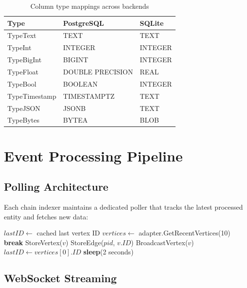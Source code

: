 \documentclass[11pt,twocolumn]{article}
\begin{document}
\begin{table}[h]
\centering
\caption{Column type mappings across backends}
\begin{tabular}{@{}lll@{}}
\toprule
Type & PostgreSQL & SQLite \\
\midrule
TypeText & TEXT & TEXT \\
TypeInt & INTEGER & INTEGER \\
TypeBigInt & BIGINT & INTEGER \\
TypeFloat & DOUBLE PRECISION & REAL \\
TypeBool & BOOLEAN & INTEGER \\
TypeTimestamp & TIMESTAMPTZ & TEXT \\
TypeJSON & JSONB & TEXT \\
TypeBytes & BYTEA & BLOB \\
\bottomrule
\end{tabular}
\label{tab:type-mapping}
\end{table}

\section{Event Processing Pipeline}

\subsection{Polling Architecture}

Each chain indexer maintains a dedicated poller that tracks the latest processed entity and fetches new data:

\begin{algorithm}
\caption{DAG Vertex Polling}
\begin{algorithmic}[1]
\State $lastID \gets$ cached last vertex ID
\Loop
        \State $vertices \gets$ adapter.GetRecentVertices(10)
                \State \textbf{break}
            \EndIf
            \State StoreVertex($v$)
                \State StoreEdge($pid$, $v.ID$)
            \EndFor
            \State BroadcastVertex($v$)
        \EndFor
        \State $lastID \gets vertices[0].ID$
    \EndIf
    \State \textbf{sleep}(2 seconds)
\EndLoop
\end{algorithmic}
\end{algorithm}

\subsection{WebSocket Streaming}
\end{document}
